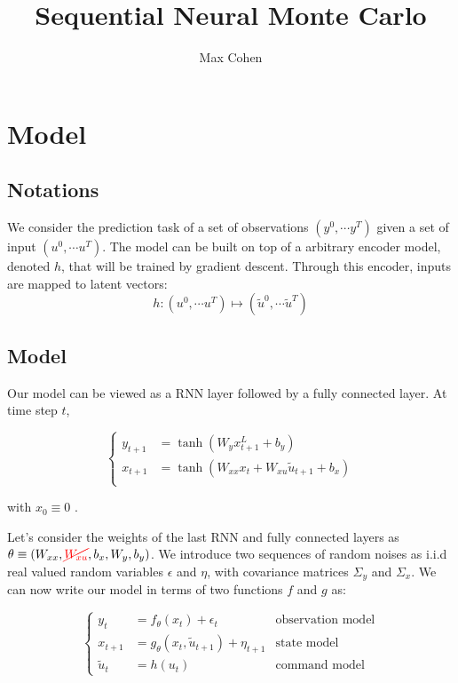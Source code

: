 \documentclass[10pt,a4paper]{report}
\begin{document}
\title{Sequential Neural Monte Carlo}
\author{Max Cohen}

\tableofcontents

\chapter{Model}
\section{Notations}
We consider the prediction task of a set of observations $(y^0, \cdots y^T)$ given a set of input $(u^0, \cdots u^T)$.
The model can be built on top of a arbitrary encoder model, denoted $h$, that will be trained by gradient descent.
Through this encoder, inputs are mapped to latent vectors:
$$
        h: (u^0, \cdots u^T) \mapsto (\tilde u^0, \cdots \tilde u^T)
$$

\section{Model}
Our model can be viewed as a RNN layer followed by a fully connected layer. At time step $t$,

\begin{equation*}
        \left\{
        \begin{aligned}
                y_{t+1} & = \tanh(W_y x_{t+1}^L + b_y)                        \\
                x_{t+1} & = \tanh(W_{xx} x_{t} + W_{xu} \tilde u_{t+1} + b_x) \\
        \end{aligned}
        \right.
\end{equation*}

with $x_{0} \equiv 0$ .

Let's consider the weights of the last RNN and fully connected layers as $\theta \equiv (W_{xx}, \textcolor{red}{\cancel{W_{xu}}}, b_x, W_y, b_y)$.
We introduce two sequences of random noises as i.i.d real valued random variables $\epsilon$ and $\eta$, with covariance matrices $\Sigma_y$ and $\Sigma_x$.
We can now write our model in terms of two functions $f$ and $g$ as:

\begin{equation}
        \left\{
        \begin{aligned}
                y_t        & = f_\theta(x_t) + \epsilon_t                   & \text{observation model} \\
                x_{t+1}    & = g_\theta(x_{t}, \tilde u_{t+1}) + \eta_{t+1} & \text{state model}       \\
                \tilde u_t & = h(u_t)                                       & \text{command model}
        \end{aligned}
        \right.
        \label{model_definition}
\end{equation}
\end{document}
